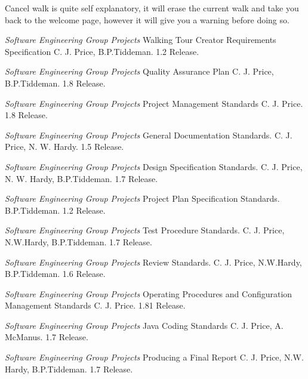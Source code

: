 \documentclass{project}
\begin{document}
Cancel walk is quite self explanatory, it will erase the current walk and take you back to the welcome page, however it will give you a warning before doing so.






\clearpage
{}
\begin{thebibliography}{5}

 \emph{Software Engineering Group Projects}
Walking Tour Creator Requirements Specification
C. J. Price, B.P.Tiddeman. 1.2 Release.

 \emph{Software Engineering Group Projects}
Quality Assurance Plan
C. J. Price, B.P.Tiddeman. 1.8 Release.

 \emph{Software Engineering Group Projects}
Project Management Standards
C. J. Price. 1.8 Release.

 \emph{Software Engineering Group Projects}
General Documentation Standards.
C. J. Price, N. W. Hardy. 1.5 Release.

 \emph{Software Engineering Group Projects}
Design Specification Standards.
C. J. Price, N. W. Hardy, B.P.Tiddeman. 1.7 Release.

 \emph{Software Engineering Group Projects}
Project Plan Specification Standards.
B.P.Tiddeman. 1.2 Release.

 \emph{Software Engineering Group Projects}
Test Procedure Standards.
C. J. Price, N.W.Hardy, B.P.Tiddeman. 1.7 Release.

 \emph{Software Engineering Group Projects}
Review Standards.
C. J. Price, N.W.Hardy, B.P.Tiddeman. 1.6 Release.

 \emph{Software Engineering Group Projects}
Operating Procedures and Configuration Management Standards
C. J. Price. 1.81 Release.

 \emph{Software Engineering Group Projects}
Java Coding Standards
C. J. Price, A. McManus. 1.7 Release.

 \emph{Software Engineering Group Projects}
Producing a Final Report
C. J. Price, N.W. Hardy, B.P.Tiddeman. 1.7 Release.

\end{thebibliography}
\end{document}
